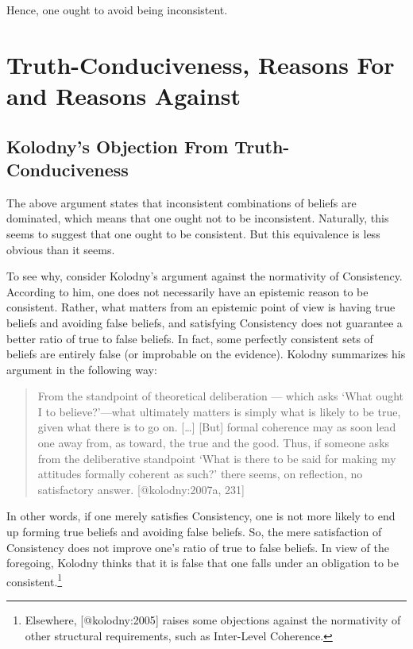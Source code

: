 \documentclass[
]{article}
\begin{document}
Hence, one ought to avoid being inconsistent.

\hypertarget{PREFIXtruth-conduciveness-reasons-for-and-reasons-against}{%
\section{Truth-Conduciveness, Reasons For and Reasons
Against}\label{PREFIXtruth-conduciveness-reasons-for-and-reasons-against}}

\hypertarget{PREFIXkolodnys-objection-from-truth-conduciveness}{%
\subsection{Kolodny's Objection From
Truth-Conduciveness}\label{PREFIXkolodnys-objection-from-truth-conduciveness}}

The above argument states that inconsistent combinations of beliefs are
dominated, which means that one ought not to be inconsistent. Naturally,
this seems to suggest that one ought to be consistent. But this
equivalence is less obvious than it seems.

To see why, consider Kolodny's argument against the normativity of
Consistency. According to him, one does not necessarily have an
epistemic reason to be consistent. Rather, what matters from an
epistemic point of view is having true beliefs and avoiding false
beliefs, and satisfying Consistency does not guarantee a better ratio of
true to false beliefs. In fact, some perfectly consistent sets of
beliefs are entirely false (or improbable on the evidence). Kolodny
summarizes his argument in the following way:

\begin{quote}
From the standpoint of theoretical deliberation --- which asks `What
ought I to believe?'---what ultimately matters is simply what is likely
to be true, given what there is to go on. {[}\ldots{]} {[}But{]} formal
coherence may as soon lead one away from, as toward, the true and the
good. Thus, if someone asks from the deliberative standpoint `What is
there to be said for making my attitudes formally coherent as such?'
there seems, on reflection, no satisfactory answer. {[}@kolodny:2007a,
231{]}
\end{quote}

In other words, if one merely satisfies Consistency, one is not more
likely to end up forming true beliefs and avoiding false beliefs. So,
the mere satisfaction of Consistency does not improve one's ratio of
true to false beliefs. In view of the foregoing, Kolodny thinks that it
is false that one falls under an obligation to be consistent.\footnote{Elsewhere,
  {[}@kolodny:2005{]} raises some objections against the normativity of
  other structural requirements, such as Inter-Level Coherence.}
\end{document}
